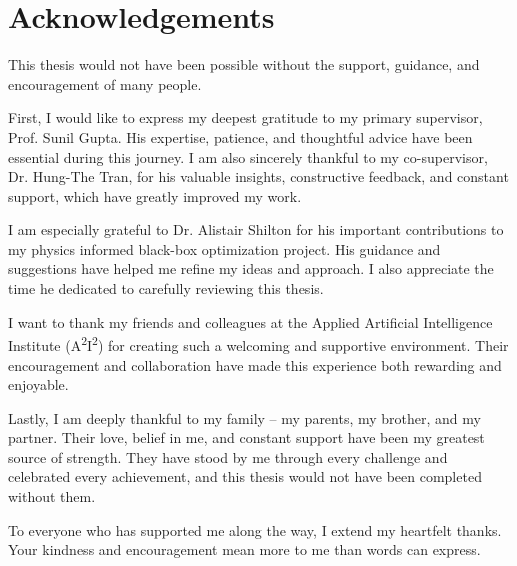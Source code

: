 \chapter*{Acknowledgements}
{}
\vspace*{\fill}
\noindent This thesis would not have been possible without the support, guidance, and encouragement of many people.

First, I would like to express my deepest gratitude to my primary supervisor, Prof. Sunil Gupta. His expertise, patience, and thoughtful advice have been essential during this journey. I am also sincerely thankful to my co-supervisor, Dr. Hung-The Tran, for his valuable insights, constructive feedback, and constant support, which have greatly improved my work.

I am especially grateful to Dr. Alistair Shilton for his important contributions to my physics informed black-box optimization project. His guidance and suggestions have helped me refine my ideas and approach. I also appreciate the time he dedicated to carefully reviewing this thesis.

I want to thank my friends and colleagues at the Applied Artificial Intelligence Institute (A\textsuperscript{2}I\textsuperscript{2}) for creating such a welcoming and supportive environment. Their encouragement and collaboration have made this experience both rewarding and enjoyable.

Lastly, I am deeply thankful to my family -- my parents, my brother, and my partner. Their love, belief in me, and constant support have been my greatest source of strength. They have stood by me through every challenge and celebrated every achievement, and this thesis would not have been completed without them.

To everyone who has supported me along the way, I extend my heartfelt thanks. Your kindness and encouragement mean more to me than words can express.
\vspace*{\fill}
\cleardoublepage
\pagestyle{plain}
